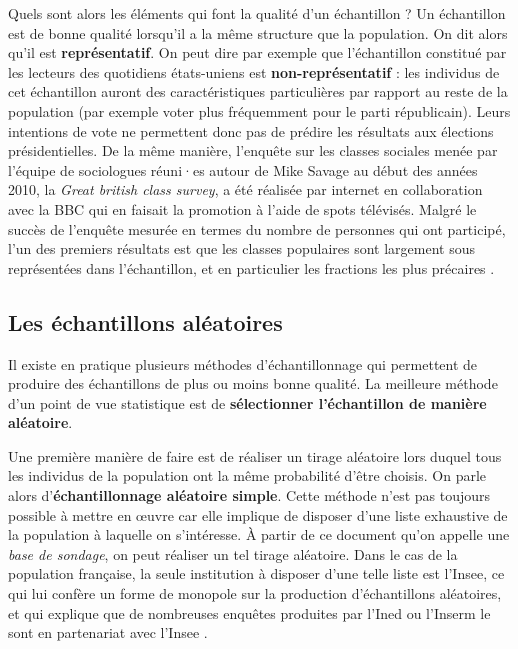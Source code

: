 \documentclass[
  french,
]{book}
\begin{document}
Quels sont alors les éléments qui font la qualité d'un échantillon ? Un échantillon est de bonne qualité lorsqu'il a la même structure que la population. On dit alors qu'il est \textbf{représentatif}. On peut dire par exemple que l'échantillon constitué par les lecteurs des quotidiens états-uniens est \textbf{non-représentatif} : les individus de cet échantillon auront des caractéristiques particulières par rapport au reste de la population (par exemple voter plus fréquemment pour le parti républicain). Leurs intentions de vote ne permettent donc pas de prédire les résultats aux élections présidentielles. De la même manière, l'enquête sur les classes sociales menée par l'équipe de sociologues réuni·es autour de Mike Savage au début des années 2010, la \emph{Great british class survey}, a été réalisée par internet en collaboration avec la BBC qui en faisait la promotion à l'aide de spots télévisés. Malgré le succès de l'enquête mesurée en termes du nombre de personnes qui ont participé, l'un des premiers résultats est que les classes populaires sont largement sous représentées dans l'échantillon, et en particulier les fractions les plus précaires \citep{savage2013}.

\hypertarget{les-uxe9chantillons-aluxe9atoires}{%
\subsection{Les échantillons aléatoires}\label{les-uxe9chantillons-aluxe9atoires}}

Il existe en pratique plusieurs méthodes d'échantillonnage qui permettent de produire des échantillons de plus ou moins bonne qualité. La meilleure méthode d'un point de vue statistique est de \textbf{sélectionner l'échantillon de manière aléatoire}.

Une première manière de faire est de réaliser un tirage aléatoire lors duquel tous les individus de la population ont la même probabilité d'être choisis. On parle alors d'\textbf{échantillonnage aléatoire simple}. Cette méthode n'est pas toujours possible à mettre en œuvre car elle implique de disposer d'une liste exhaustive de la population à laquelle on s'intéresse. À partir de ce document qu'on appelle une \emph{base de sondage}, on peut réaliser un tel tirage aléatoire. Dans le cas de la population française, la seule institution à disposer d'une telle liste est l'Insee, ce qui lui confère un forme de monopole sur la production d'échantillons aléatoires, et qui explique que de nombreuses enquêtes produites par l'Ined ou l'Inserm le sont en partenariat avec l'Insee \citep[p.66]{bugeja-bloch2021}.
\end{document}
